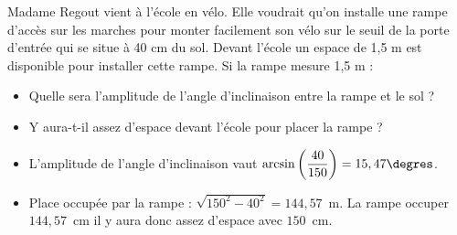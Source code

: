 \documentclass[a4paper, 12pt, parskip=half-]{scrartcl}
\begin{document}
\begin{exercise}[points=3]
    Madame Regout vient à l'école en vélo. Elle voudrait qu'on installe une rampe d'accès sur les marches pour monter facilement son vélo sur le seuil de la porte d'entrée qui se situe à 40 cm du sol. Devant l'école un espace de 1,5 m est disponible pour installer cette rampe. Si la rampe mesure 1,5 m :
    \begin{itemize}
        \item Quelle sera l'amplitude de l'angle d'inclinaison entre la rampe et le sol ?
        \item Y aura-t-il assez d'espace devant l'école pour placer la rampe ?
    \end{itemize}
\end{exercise}
\begin{solution}
    \begin{itemize}
        \item 
        L'amplitude de l'angle d'inclinaison vaut $\arcsin\left(\dfrac{40}{150}\right)=15,47\degres$.
        \item 
        Place occupée par la rampe : $\sqrt{150^2 - 40^2} = 144,57$~m. La rampe occuper $144,57$~cm il y aura donc assez d'espace avec $150$~cm.
    \end{itemize}
\end{solution}

\newpage
\printsolutions
\end{document}
